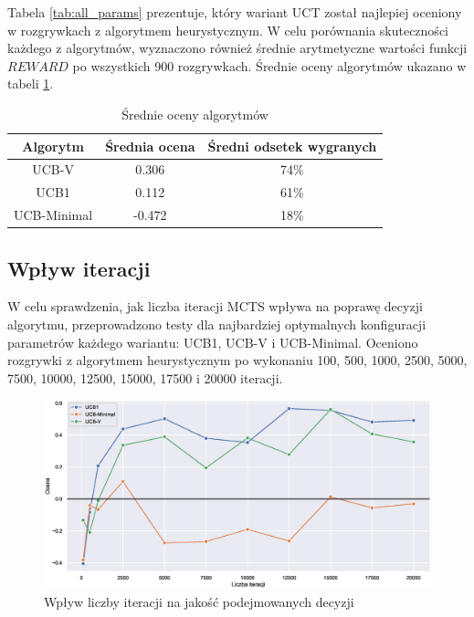\documentclass[a4paper,12pt]{article}
\begin{document}
Tabela \ref{tab:all_params} prezentuje, który wariant UCT został najlepiej oceniony w rozgrywkach z algorytmem heurystycznym. W celu porównania skuteczności każdego z algorytmów, wyznaczono również średnie arytmetyczne wartości funkcji $REWARD$ po wszystkich 900 rozgrywkach. Średnie oceny algorytmów ukazano w tabeli \ref{tab:avg_grade}.

\begin{table}[!h]
	\centering
	\begin{tabular}{|c|c|c|} \hline
		Algorytm & Średnia ocena & Średni odsetek wygranych\\ \hline
		UCB-V & 0.306 & 74\% \\ \hline
		UCB1 & 0.112 & 61\% \\ \hline
		UCB-Minimal & -0.472 & 18\% \\ \hline
	\end{tabular}
	\caption{Średnie oceny algorytmów}
	\label{tab:avg_grade}
\end{table}

\clearpage

\subsection{Wpływ iteracji} \label{subs:iterations}
W celu sprawdzenia, jak liczba iteracji MCTS wpływa na poprawę decyzji algorytmu, przeprowadzono testy dla najbardziej optymalnych konfiguracji parametrów każdego wariantu: UCB1, UCB-V i UCB-Minimal. Oceniono rozgrywki z algorytmem heurystycznym po wykonaniu 100, 500, 1000, 2500, 5000, 7500, 10000, 12500, 15000, 17500 i 20000 iteracji.

\begin{figure}[h]
	\centering
	\includegraphics[width=\textwidth]{iterations}
	\caption{Wpływ liczby iteracji na jakość podejmowanych decyzji}
	\label{rys:iterations}
\end{figure}
\end{document}
